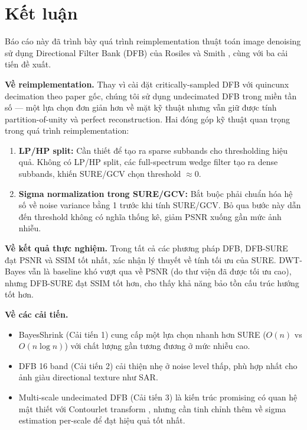\section{Kết luận}
\label{sec:conclusion}

Báo cáo này đã trình bày quá trình reimplementation thuật toán image denoising sử dụng Directional Filter Bank (DFB) của Rosiles và Smith \cite{rosiles2000}, cùng với ba cải tiến đề xuất.

\textbf{Về reimplementation.}
Thay vì cài đặt critically-sampled DFB với quincunx decimation theo paper gốc, chúng tôi sử dụng undecimated DFB trong miền tần số --- một lựa chọn đơn giản hơn về mặt kỹ thuật nhưng vẫn giữ được tính partition-of-unity và perfect reconstruction. Hai đóng góp kỹ thuật quan trọng trong quá trình reimplementation:
\begin{enumerate}
    \item \textbf{LP/HP split:} Cần thiết để tạo ra sparse subbands cho thresholding hiệu quả. Không có LP/HP split, các full-spectrum wedge filter tạo ra dense subbands, khiến SURE/GCV chọn threshold $\approx 0$.
    \item \textbf{Sigma normalization trong SURE/GCV:} Bắt buộc phải chuẩn hóa hệ số về noise variance bằng 1 trước khi tính SURE/GCV. Bỏ qua bước này dẫn đến threshold không có nghĩa thống kê, giảm PSNR xuống gần mức ảnh nhiễu.
\end{enumerate}

\textbf{Về kết quả thực nghiệm.}
Trong tất cả các phương pháp DFB, DFB-SURE đạt PSNR và SSIM tốt nhất, xác nhận lý thuyết về tính tối ưu của SURE. DWT-Bayes vẫn là baseline khó vượt qua về PSNR (do thư viện đã được tối ưu cao), nhưng DFB-SURE đạt SSIM tốt hơn, cho thấy khả năng bảo tồn cấu trúc hướng tốt hơn.

\textbf{Về các cải tiến.}
\begin{itemize}
    \item BayesShrink (Cải tiến 1) cung cấp một lựa chọn nhanh hơn SURE ($O(n)$ vs $O(n\log n)$) với chất lượng gần tương đương ở mức nhiễu cao.
    \item DFB 16 band (Cải tiến 2) cải thiện nhẹ ở noise level thấp, phù hợp nhất cho ảnh giàu directional texture như SAR.
    \item Multi-scale undecimated DFB (Cải tiến 3) là kiến trúc promising có quan hệ mật thiết với Contourlet transform \cite{do2005}, nhưng cần tinh chỉnh thêm về sigma estimation per-scale để đạt hiệu quả tốt nhất.
\end{itemize}

